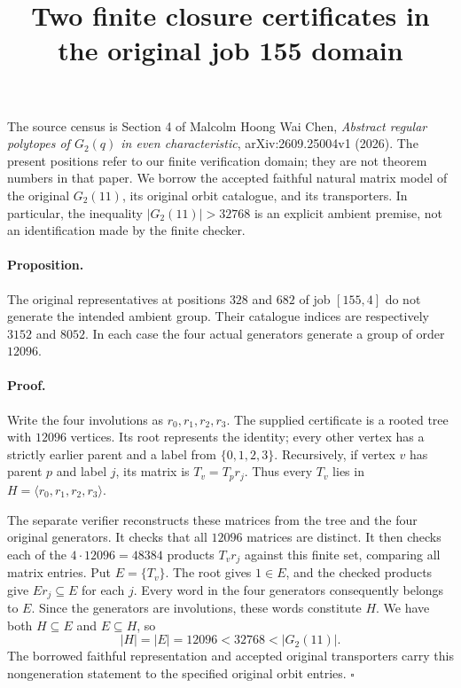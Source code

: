 \documentclass[11pt]{article}
\title{Two finite closure certificates in the original job 155 domain}
\author{}
\date{}
\newcommand{\Gen}[1]{\langle #1\rangle}
\begin{document}
\maketitle

The source census is Section 4 of Malcolm Hoong Wai Chen,
\emph{Abstract regular polytopes of $G_2(q)$ in even characteristic},
arXiv:2609.25004v1 (2026). The present positions refer to our finite
verification domain; they are not theorem numbers in that paper.
We borrow the accepted faithful natural matrix model of the original
$G_2(11)$, its original orbit catalogue, and its transporters. In particular,
the inequality $|G_2(11)|>32768$ is an explicit ambient premise, not an
identification made by the finite checker.

\paragraph{Proposition.}
The original representatives at positions $328$ and $682$ of job $[155,4]$
do not generate the intended ambient group. Their catalogue indices are
respectively $3152$ and $8052$. In each case the four actual generators
generate a group of order $12096$.

\paragraph{Proof.}
Write the four involutions as $r_0,r_1,r_2,r_3$. The supplied certificate
is a rooted tree with $12096$ vertices. Its root represents the identity;
every other vertex has a strictly earlier parent and a label from
$\{0,1,2,3\}$. Recursively, if vertex $v$ has parent $p$ and label $j$,
its matrix is $T_v=T_p r_j$. Thus every $T_v$ lies in
$H=\Gen{r_0,r_1,r_2,r_3}$.

The separate verifier reconstructs these matrices from the tree and the
four original generators. It checks that all $12096$ matrices are distinct.
It then checks each of the $4\cdot12096=48384$ products $T_vr_j$ against
this finite set, comparing all matrix entries. Put $E=\{T_v\}$. The root
gives $1\in E$, and the checked products give $Er_j\subseteq E$ for each
$j$. Every word in the four generators consequently belongs to $E$.
Since the generators are involutions, these words constitute $H$.
We have both $H\subseteq E$ and $E\subseteq H$, so
\[
  |H|=|E|=12096<32768<|G_2(11)|.
\]
The borrowed faithful representation and accepted original transporters
carry this nongeneration statement to the specified original orbit entries.
\hfill$\square$
\end{document}
